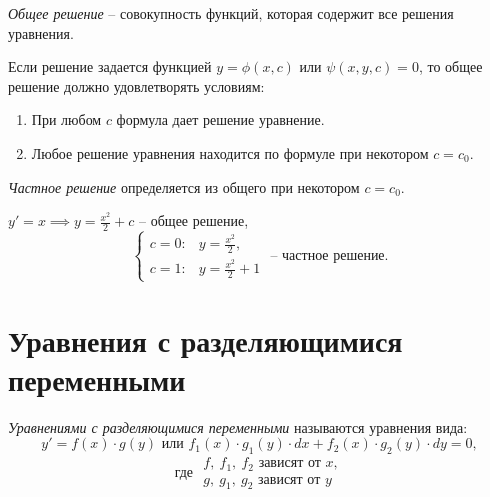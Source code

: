 \begin{definition}
    \emph{Общее решение} -- совокупность функций, которая содержит все решения уравнения.

    Если решение задается функцией $y = \phi(x,c)$ или $\psi(x,y,c) = 0$, то общее решение должно удовлетворять условиям:
    \begin{enumerate}
        \item При любом $c$ формула дает решение уравнение.
        \item Любое решение уравнения находится по формуле при некотором $c = c_0$.
    \end{enumerate}
\end{definition}

\begin{definition}
    \emph{Частное решение} определяется из общего при некотором $c = c_0$.
\end{definition}

\begin{example}
    $y'=x \implies y = \frac{x^2}{2}+c$ -- общее решение,
    \[
        \left\{\begin{array}{ll}
            c=0: & y = \frac{x^2}{2},  \\
            c=1: & y=\frac{x^2}{2} + 1
        \end{array}\right.\text{ -- частное решение}.
    \]
\end{example}

\section{Уравнения с разделяющимися переменными}

\begin{definition}
    \emph{Уравнениями с разделяющимися переменными} называются уравнения вида:
    \[
        y'=f(x)\cdot g(y)\text{ или }f_1(x) \cdot g_1(y)\cdot dx + f_2(x) \cdot g_2(y)\cdot dy = 0,
    \]
    \[
        \text{где }\begin{array}{l}
            f, \ f_1, \ f_2\text{ зависят от }x, \\
            g, \ g_1, \ g_2\text{ зависят от }y
        \end{array}
    \]
\end{definition}


